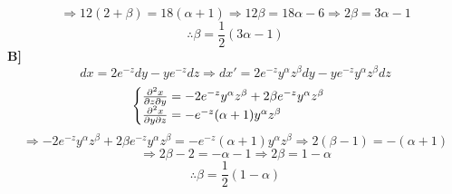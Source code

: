         \begin{equation}
            \Rightarrow 12(2+\beta) = 18(\alpha+1) \Rightarrow 12\beta = 18\alpha -6 \Rightarrow 2\beta = 3\alpha-1
        \end{equation}
        \begin{equation}
            \boxed{\therefore \beta = \frac{1}{2}(3\alpha-1)}
        \end{equation}
        \textbf{B]}
        \begin{equation}
            dx = 2e^{-z}dy - ye^{-z}dz \Rightarrow dx' = 2e^{-z}y^\alpha z^\beta dy - ye^{-z}y^\alpha z^\beta dz
        \end{equation}
        \begin{equation}
            \begin{cases}
                \frac{\partial ^2x}{\partial z\partial y} = -2e^{-z}y^\alpha z^\beta +2\beta e^{-z}y^\alpha z^\beta \\ 
                \frac{\partial ^2x}{\partial y\partial z} = -e^{-z}(\alpha+1)y^\alpha z^\beta
            \end{cases} 
        \end{equation}
        \begin{equation}
            \Rightarrow -2e^{-z}y^\alpha z^\beta +2\beta e^{-z}y^\alpha z^\beta = -e^{-z}(\alpha+1)y^\alpha z^\beta \Rightarrow 2(\beta-1) = - (\alpha + 1)
        \end{equation}
        \begin{equation}
            \Rightarrow 2\beta-2 = -\alpha-1 \Rightarrow 2\beta = 1-\alpha
        \end{equation}
        \begin{equation}
            \boxed{\therefore \beta = \frac{1}{2}(1-\alpha)}
        \end{equation}
        

